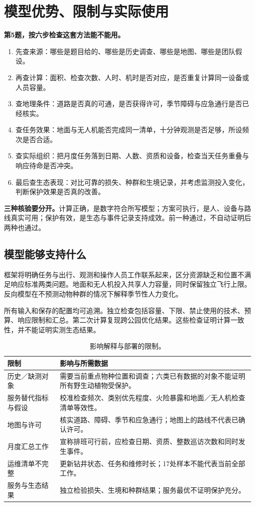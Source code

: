 \documentclass[12pt,a4paper]{article}
\numberwithin{equation}{section}
\begin{document}
\section{模型优势、限制与实际使用}
\noindent\textbf{第5题，按六步检查这套方法能不能用。}
\begin{enumerate}
\item 先查来源：哪些是题目给的、哪些是历史调查、哪些是地图、哪些是团队假设。
\item 再查计算：面积、检查次数、人时、机时是否对应，是否重复计算同一设备或人员容量。
\item 查地理条件：道路是否真的可通，是否获得许可，季节障碍与应急通行是否已经核实。
\item 查任务效果：地面与无人机能否完成同一清单，十分钟观测是否足够，所设频次是否合适。
\item 查实际组织：把月度任务落到日期、人数、资质和设备，检查当天任务重叠与响应待命是否冲突。
\item 最后查生态表现：对比可靠的损失、种群和生境记录，并考虑监测投入变化，判断保护效果是否真的改善。
\end{enumerate}
\noindent\textbf{三种核验要分开。}计算正确，是数字符合所写模型；方案可执行，是人、设备与路线真实可用；保护有效，是生态与事件记录支持成效。前一种通过，不自动证明后两种也通过。

\subsection{模型能够支持什么}
框架将明确任务与出行、观测和操作人员工作联系起来，区分资源缺乏和位置不满足响应标准两类问题。地面和无人机投入共享人力容量，同时保留独立飞行上限。反向模型在不预测动物种群的情况下解释季节性人力变化。

所有输入和保存的配置均可追溯。独立检查包括容量、下限、禁止使用的技术、预算、响应限制和汇总。第二次计算复现跨公园优化结果。这些检查证明计算一致性，并不能证明实测生态结果。

\begin{table}[H]
\centering\normalsize
\caption{影响解释与部署的限制。}
\label{tab:limits}
\begin{tabularx}{\linewidth}{>{\raggedright\arraybackslash}p{4.0cm}>{\raggedright\arraybackslash}X}
\toprule
限制 & 影响与所需数据 \\
\midrule
历史／缺测对象 & 需要当前重点物种位置和调查；六类已有数据的对象不能证明所有野生动植物受保护。 \\
服务替代指标与假设 & 校准检查频次、类别优先程度、火险暴露和地面／无人机检查清单等效性。 \\
地图与许可 & 核实道路、障碍、季节和应急通行；地图上的路线不代表已确认许可。 \\
月度汇总工作 & 宣称排班可行前，应检查日期、资质、整数巡访次数和同时发生事件。 \\
运维清单不完整 & 更新钻井状态、任务和维修时长；17处样本不能代表当前全部工作。 \\
服务与生态结果 & 独立检验损失、生境和种群结果；服务最优不证明保护充分。 \\
\bottomrule
\end{tabularx}
\end{table}
\end{document}
